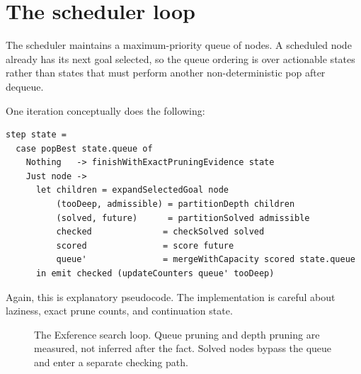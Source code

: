 \documentclass[10pt,letterpaper,oneside]{report}
\begin{document}
\section{The scheduler loop}\label{sec:exference-scheduler}

The scheduler maintains a maximum-priority queue of nodes. A scheduled node already has its next goal selected, so the queue ordering is over actionable states rather than states that must perform another non-deterministic pop after dequeue.

One iteration conceptually does the following:

\begin{lstlisting}[language=Haskellish]
step state =
  case popBest state.queue of
    Nothing   -> finishWithExactPruningEvidence state
    Just node ->
      let children = expandSelectedGoal node
          (tooDeep, admissible) = partitionDepth children
          (solved, future)      = partitionSolved admissible
          checked              = checkSolved solved
          scored               = score future
          queue'               = mergeWithCapacity scored state.queue
      in emit checked (updateCounters queue' tooDeep)
\end{lstlisting}

Again, this is explanatory pseudocode. The implementation is careful about laziness, exact prune counts, and continuation state.

\begin{figure}[htbp]
\centering
{}
\caption{The Exference search loop. Queue pruning and depth pruning are measured, not inferred after the fact. Solved nodes bypass the queue and enter a separate checking path.}
\label{fig:exference-loop}
\end{figure}
\end{document}
